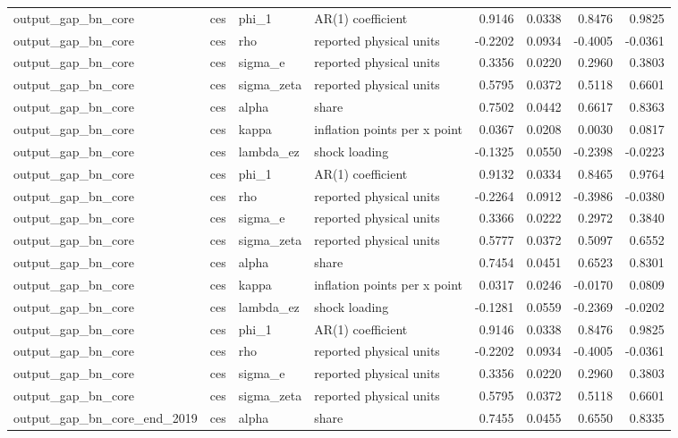\begin{tabular}{llllrrrr}
output\_gap\_bn\_core & ces & phi\_1 & AR(1) coefficient & 0.9146 & 0.0338 & 0.8476 & 0.9825 \\
output\_gap\_bn\_core & ces & rho & reported physical units & -0.2202 & 0.0934 & -0.4005 & -0.0361 \\
output\_gap\_bn\_core & ces & sigma\_e & reported physical units & 0.3356 & 0.0220 & 0.2960 & 0.3803 \\
output\_gap\_bn\_core & ces & sigma\_zeta & reported physical units & 0.5795 & 0.0372 & 0.5118 & 0.6601 \\
output\_gap\_bn\_core & ces & alpha & share & 0.7502 & 0.0442 & 0.6617 & 0.8363 \\
output\_gap\_bn\_core & ces & kappa & inflation points per x point & 0.0367 & 0.0208 & 0.0030 & 0.0817 \\
output\_gap\_bn\_core & ces & lambda\_ez & shock loading & -0.1325 & 0.0550 & -0.2398 & -0.0223 \\
output\_gap\_bn\_core & ces & phi\_1 & AR(1) coefficient & 0.9132 & 0.0334 & 0.8465 & 0.9764 \\
output\_gap\_bn\_core & ces & rho & reported physical units & -0.2264 & 0.0912 & -0.3986 & -0.0380 \\
output\_gap\_bn\_core & ces & sigma\_e & reported physical units & 0.3366 & 0.0222 & 0.2972 & 0.3840 \\
output\_gap\_bn\_core & ces & sigma\_zeta & reported physical units & 0.5777 & 0.0372 & 0.5097 & 0.6552 \\
output\_gap\_bn\_core & ces & alpha & share & 0.7454 & 0.0451 & 0.6523 & 0.8301 \\
output\_gap\_bn\_core & ces & kappa & inflation points per x point & 0.0317 & 0.0246 & -0.0170 & 0.0809 \\
output\_gap\_bn\_core & ces & lambda\_ez & shock loading & -0.1281 & 0.0559 & -0.2369 & -0.0202 \\
output\_gap\_bn\_core & ces & phi\_1 & AR(1) coefficient & 0.9146 & 0.0338 & 0.8476 & 0.9825 \\
output\_gap\_bn\_core & ces & rho & reported physical units & -0.2202 & 0.0934 & -0.4005 & -0.0361 \\
output\_gap\_bn\_core & ces & sigma\_e & reported physical units & 0.3356 & 0.0220 & 0.2960 & 0.3803 \\
output\_gap\_bn\_core & ces & sigma\_zeta & reported physical units & 0.5795 & 0.0372 & 0.5118 & 0.6601 \\
output\_gap\_bn\_core\_end\_2019 & ces & alpha & share & 0.7455 & 0.0455 & 0.6550 & 0.8335 \\

\end{tabular}
